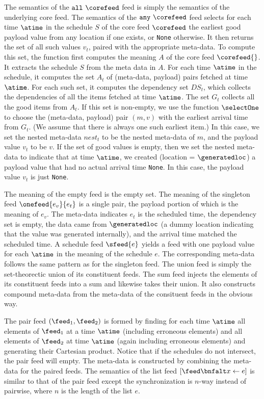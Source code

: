 The semantics of the $\mathtt{all}\ \corefeed$ feed is simply the semantics
of the underlying core feed.
The semantics of the $\mathtt{any}\ \corefeed$ feed selects for each
time $\atime$ in the schedule $S$ of the core feed $\corefeed$ the
earliest good payload value from any location if one exists, or
\texttt{None} otherwise.  It then returns the set of all such values
$v_t$, paired with the appropriate meta-data.  
To compute this set, the function first computes
the meaning $A$ of the core feed $\corefeed{}$.  It extracts the
schedule $S$ from the meta data in $A$.  For each time $\atime$ in the
schedule, it computes the set $A_t$ of (meta-data, payload) pairs
fetched at time $\atime$.  For each such set, it computes the
dependency set $DS_t$, which collects the dependencies of all the
items fetched at time $\atime$.  The set $G_t$ collects all the good
items from $A_t$. If this set is non-empty, we use the function 
$\selectOne$ to choose the (meta-data, payload) pair $(m,v)$ with the
earliest arrival time from $G_t$.  (We assume that there is always one
such earliest item.)  In this case, we set the nested
meta-data $nest_t$ to be the nested meta-data of $m$, and the payload
value $v_t$ to be $v$.  If the set of good values is empty, then we set the nested
meta-data to indicate that at time $\atime$, we created (location =
$\generatedloc$) a payload value that had no actual
arrival time \texttt{None}.  In this case, the payload value $v_t$ is
just \texttt{None}. 

The meaning of the empty feed is the empty set.  
The meaning of the singleton feed $\onefeed{e_v}{e_t}$ is a single
pair, the payload portion of which is the meaning of $e_v$.  The
meta-data indicates $e_t$ is the scheduled time, the dependency
set is empty, the data came from $\generatedloc$ (a dummy location
indicating that the value was generated internally), and the arrival time
matched the scheduled time. 
A schedule feed $\sfeed{e}$ yields a feed with one payload value for
each $\atime$ in the meaning of the schedule $e$.  The corresponding
meta-data follows the same pattern as for the singleton feed.  
The union feed is simply the set-theorectic union of its constituent
feeds. The sum feed injects the elements of its constituent
feeds into a sum and likewise takes their union.  It also constructs
compound meta-data from the meta-data of the consituent feeds in the
obvious way.

The pair feed $(\feed_1,\feed_2)$ is formed by finding for each time
$\atime$ all elements
of $\feed_1$ at a time $\atime$ (including erroneous elements) and all
elements of $\feed_2$ at time $\atime$ (again including erroneous
elements) and generating their Cartesian product.  Notice that 
if the schedules do not intersect, the pair feed will empty.  The
meta-data is constructed by combining the meta-data for the paired
feeds.
The semantics of the list feed $[\feed \bnfalt x \leftarrow e ]$ is
similar to that of the pair feed except the synchronization is $n$-way
instead of pairwise, where $n$ is the length of the list $e$. 

